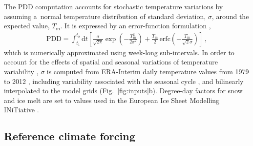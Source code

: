 \documentclass[tc, manuscript]{copernicus}
\begin{document}
    The PDD computation accounts for stochastic temperature variations by
    assuming a~normal temperature distribution of standard deviation, $\sigma$,
    around the expected value, $T_{\mathrm{m}}$. It is expressed by an
    error-function formulation \citep{Calov.Greve.2005},
    \begin{align}
      {\text{PDD}} = \int_{t_1}^{t_2} \mathrm{d}t
        \left[\frac{\sigma}{\sqrt{2\pi}}
                \exp\left({-\frac{T_{\mathrm{m}}^2}{2\sigma^2}}\right)
              + \frac{T_{\mathrm{m}}}{2} \, {\text{erfc}}
                \left(-\frac{T_{\mathrm{m}}}{\sqrt{2}\sigma}\right)\right] \,,
    \end{align}
    which is numerically approximated using week-long sub-intervals. In
    order to account for the effects of spatial and seasonal variations of
    temperature variability \citep{Seguinot.2013}, $\sigma$ is computed
    from ERA-Interim daily temperature values from 1979 to 2012
    \citep{Mesinger.etal.2006}, including variability associated with the
    seasonal cycle \citep{Seguinot.2013}, and bilinearly interpolated to the
    model grids (Fig.~\ref{fig:inputs}b). Degree-day factors for snow and ice
    melt are set to values used in the European Ice Sheet Modelling INiTiative
    \citep[Table~\ref{tab:params}; EISMINT,][]{Huybrechts.1998}.


\subsection{Reference climate forcing}
\label{sec:atm}
\end{document}
